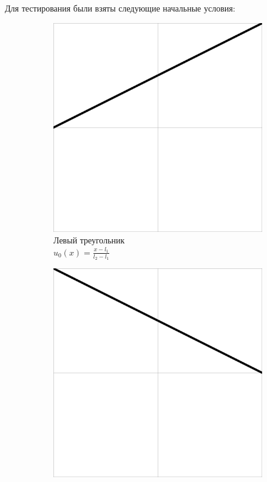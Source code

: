\documentclass[12pt, a4paper]{article}
\begin{document}
Для тестирования были взяты следующие начальные условия:
\begin{figure}[!hp]
	\centering
	\begin{subfigure}[t]{0.32\textwidth}
		\centering
		\includegraphics[width=\textwidth]{test1}
		\caption{Левый треугольник \\ $u_0(x) = \frac{x-l_1}{l_2-l_1}$}
		\label{test1}
	\end{subfigure}
	\hfill
	\begin{subfigure}[t]{0.32\textwidth}
		\centering
		\includegraphics[width=\textwidth]{test2}

\end{subfigure}
\end{figure}
\end{document}
